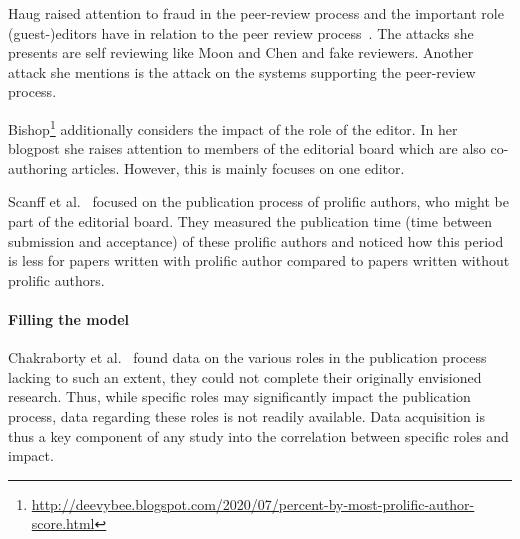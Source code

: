\documentclass{ou-report}
\newcommand{\todo}[1]{{\color{red} TODO: #1}}
\begin{document}
Haug raised attention to fraud in the peer-review process and the important role
(guest-)editors have in relation to the peer review process~\cite{Haug2015}. The 
attacks she presents are self reviewing like Moon and Chen and fake reviewers.
Another attack she mentions is the attack on the systems supporting the peer-review
process.

Bishop\footnote{\url{http://deevybee.blogspot.com/2020/07/percent-by-most-prolific-author-score.html}}
additionally considers the impact of the role of the editor.
In her blogpost she raises attention to members of the editorial board which are
also co-authoring articles. However, this is mainly focuses on one editor.

Scanff et al.~\cite{SNCMBL2021} focused on the publication process of prolific
authors, who might be part of the editorial board. They measured the
publication time (time between submission and acceptance) of these prolific
authors and noticed how this period is less for papers written with prolific
author compared to papers written without prolific authors. 


\paragraph{Filling the model}
Chakraborty et al.~\cite{CPN2021} found data on the various
roles in the publication process lacking to such an extent, they could not complete
their originally envisioned research. Thus, while specific roles may significantly
impact the publication process, data regarding these roles is not readily available.
Data acquisition is thus a key component of any study into the correlation between
specific roles and impact.
\end{document}
